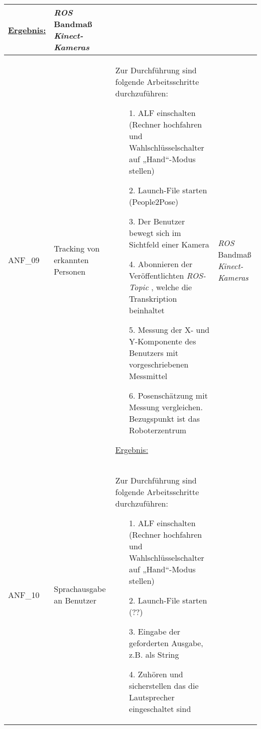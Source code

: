 \documentclass[12pt,a4paper,oneside,numbers=noenddot,captions=tableheading,toc=bibliography,openany,tikz,margin=5mm]{scrbook}
\begin{document}
\begin{longtable}{|p{}|p{}|p{7cm}|p{}|}
\begin{itemize}
	\end{itemize}
	
	\underline{Ergebnis:}\newline
	\newline
	
	\textbf{}	%
	& \textit{ROS}\newline
	Bandmaß\newline
	\textit{Kinect-Kameras}
	\\
	\hline
	
	ANF\_09 & Tracking von erkannten Personen & Zur Durchführung sind folgende Arbeitsschritte durchzuführen:
	\begin{itemize}
		\item[1.]	ALF einschalten (Rechner hochfahren und Wahlschlüsselschalter auf „Hand“-Modus stellen)
		\item[2.]	Launch-File starten (People2Pose)
		\item[3.]	Der Benutzer bewegt sich im Sichtfeld einer Kamera
		\item[4.]Abonnieren der Veröffentlichten \textit{ROS-Topic} , welche die Transkription beinhaltet 
		\item[5.]	Messung der X- und Y-Komponente des Benutzers mit vorgeschriebenen Messmittel
		\item[6.]	Posenschätzung mit Messung vergleichen. Bezugspunkt ist das Roboterzentrum
	\end{itemize}
	
	\underline{Ergebnis:}\newline
	\newline
	
	\textbf{}%
	& \textit{ROS}\newline
	Bandmaß\newline
	\textit{Kinect-Kameras}
	\\
	\hline
	
		ANF\_10 & Sprachausgabe an Benutzer & Zur Durchführung sind folgende Arbeitsschritte durchzuführen:
	\begin{itemize}
		\item[1.]	ALF einschalten (Rechner hochfahren und Wahlschlüsselschalter auf „Hand“-Modus stellen)
		\item[2.]	Launch-File starten (??)
		\item[3.]	Eingabe der geforderten Ausgabe, z.B. als String
		\item[4.]	Zuhören und sicherstellen das die Lautsprecher eingeschaltet sind
	\end{itemize}
	

\end{longtable}
\end{document}
